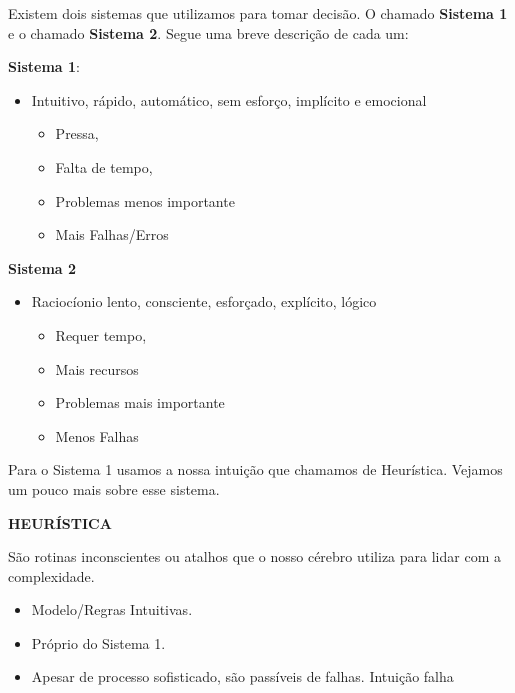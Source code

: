 \documentclass[
  letterpaper,
  DIV=11,
  numbers=noendperiod]{scrreprt}
\providecommand{\tightlist}{%
  \setlength{\itemsep}{0pt}\setlength{\parskip}{0pt}}
\begin{document}
\begin{figure}
\begin{minipage}{0.30\linewidth}
\begin{figure}[H]
{}


\end{figure}%

\end{minipage}%

\end{figure}%

Existem dois sistemas que utilizamos para tomar decisão. O chamado
\textbf{Sistema 1} e o chamado \textbf{Sistema 2}. Segue uma breve
descrição de cada um:

\textbf{Sistema 1}:

\begin{itemize}
\tightlist
\item
  Intuitivo, rápido, automático, sem esforço, implícito e emocional

  \begin{itemize}
  \tightlist
  \item
    Pressa,
  \item
    Falta de tempo,
  \item
    Problemas menos importante
  \item
    Mais Falhas/Erros
  \end{itemize}
\end{itemize}

\textbf{Sistema 2}

\begin{itemize}
\tightlist
\item
  Raciocíonio lento, consciente, esforçado, explícito, lógico

  \begin{itemize}
  \tightlist
  \item
    Requer tempo,
  \item
    Mais recursos
  \item
    Problemas mais importante
  \item
    Menos Falhas
  \end{itemize}
\end{itemize}

Para o Sistema 1 usamos a nossa intuição que chamamos de Heurística.
Vejamos um pouco mais sobre esse sistema.

\textbf{HEURÍSTICA}

São rotinas inconscientes ou atalhos que o nosso cérebro utiliza para
lidar com a complexidade.

\begin{itemize}
\tightlist
\item
  Modelo/Regras Intuitivas.
\item
  Próprio do Sistema 1.
\item
  Apesar de processo sofisticado, são passíveis de falhas. Intuição
  falha
\end{itemize}
\end{document}
